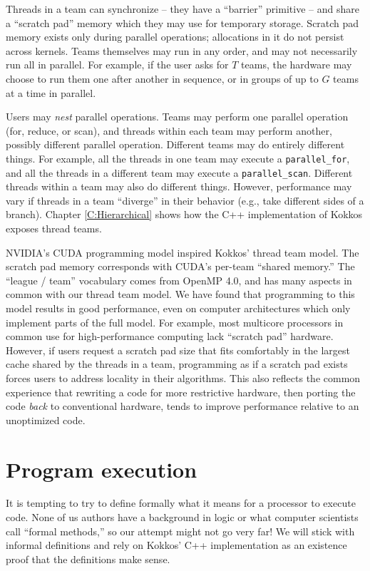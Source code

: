 Threads in a team can synchronize -- they have a ``barrier'' primitive -- 
and share a ``scratch pad'' memory which they may use for temporary storage.
Scratch pad memory exists only during parallel operations;
allocations in it do not persist across kernels.
Teams themselves may run in any order,
and may not necessarily run all in parallel.
For example, if the user asks for $T$ teams,
the hardware may choose to run them one after another in sequence,
or in groups of up to $G$ teams at a time in parallel.

Users may \emph{nest} parallel operations.
Teams may perform one parallel operation (for, reduce, or scan),
and threads within each team may perform another, possibly different parallel operation.
Different teams may do entirely different things.
For example, all the threads in one team may execute a \lstinline!parallel_for!,
and all the threads in a different team may execute a \lstinline!parallel_scan!.
Different threads within a team may also do different things.
However, performance may vary if threads in a team ``diverge'' in their behavior
(e.g., take different sides of a branch).
Chapter \ref{C:Hierarchical} shows how the C++ implementation of Kokkos exposes thread teams.

NVIDIA's CUDA programming model inspired Kokkos' thread team model.
The scratch pad memory corresponds with CUDA's per-team ``shared memory.''
The ``league / team'' vocabulary comes from OpenMP 4.0,
and has many aspects in common with our thread team model.
We have found that programming to this model results in good performance,
even on computer architectures which only implement parts of the full model.
For example, most multicore processors in common use for high-performance computing lack ``scratch pad'' hardware.
However, if users request a scratch pad size that fits comfortably in the largest cache shared by the threads in a team,
programming as if a scratch pad exists forces users to address locality in their algorithms.
This also reflects the common experience that rewriting a code for more restrictive hardware,
then porting the code \emph{back} to conventional hardware,
tends to improve performance relative to an unoptimized code.

\section{Program execution}\label{S:Model:Exec}

It is tempting to try to define formally what it means for a processor to execute code.
None of us authors have a background in logic or what computer scientists call ``formal methods,''
so our attempt might not go very far!
We will stick with informal definitions and rely on Kokkos' C++ implementation
as an existence proof that the definitions make sense.

